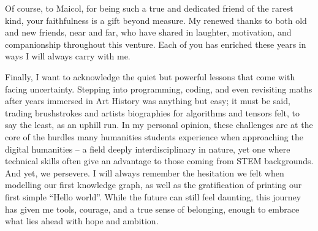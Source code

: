 \begin{spacing}{1.5}
Of course, to Maicol, for being such a true and dedicated friend of the rarest kind, your faithfulness is a gift beyond measure. My renewed thanks to both old and new friends, near and far, who have shared in laughter, motivation, and companionship throughout this venture. Each of you has enriched these years in ways I will always carry with me.

Finally, I want to acknowledge the quiet but powerful lessons that come with facing uncertainty. Stepping into programming, coding, and even revisiting maths after years immersed in Art History was anything but easy; it must be said, trading brushstrokes and artists biographies for algorithms and tensors felt, to say the least, as an uphill run. In my personal opinion, these challenges are at the core of the hurdles many humanities students experience when approaching the digital humanities -- a field deeply interdisciplinary in nature, yet one where technical skills often give an advantage to those coming from STEM backgrounds. And yet, we persevere. I will always remember the hesitation we felt when modelling our first knowledge graph, as well as the gratification of printing our first simple ``Hello world''. While the future can still feel daunting, this journey has given me tools, courage, and a true sense of belonging, enough to embrace what lies ahead with hope and ambition.

\end{spacing}